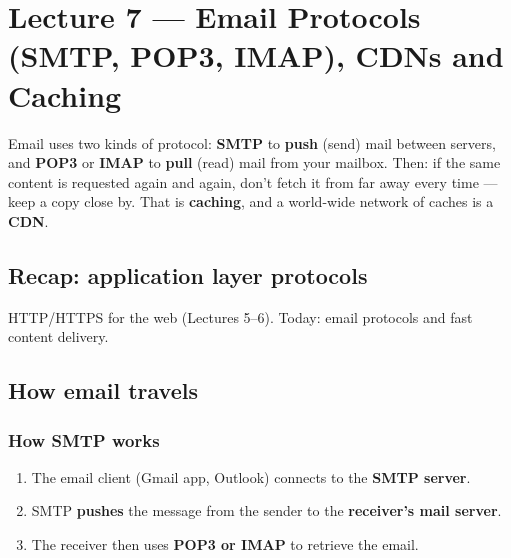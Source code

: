\chapter{Lecture 7 --- Email Protocols (SMTP, POP3, IMAP), CDNs and Caching}

\begin{keyidea}
Email uses two kinds of protocol: \textbf{SMTP} to \textbf{push} (send) mail between servers, and \textbf{POP3} or \textbf{IMAP} to \textbf{pull} (read) mail from your mailbox. Then: if the same content is requested again and again, don't fetch it from far away every time --- keep a copy close by. That is \textbf{caching}, and a world-wide network of caches is a \textbf{CDN}.
\end{keyidea}

\section{Recap: application layer protocols}
HTTP/HTTPS for the web (Lectures 5--6). Today: email protocols and fast content delivery.

\section{How email travels}

\begin{center}
\end{center}

\subsection{How SMTP works}
\begin{enumerate}
  \item The email client (Gmail app, Outlook) connects to the \textbf{SMTP server}.
  \item SMTP \textbf{pushes} the message from the sender to the \textbf{receiver's mail server}.
  \item The receiver then uses \textbf{POP3 or IMAP} to retrieve the email.
\end{enumerate}

